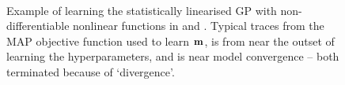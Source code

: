 \documentclass{article} %
\begin{document}
\begin{figure}[htb]
    \\
    \caption[]{Example of learning the statistically linearised GP with
        non-differentiable nonlinear functions in  and
        . Typical traces from the MAP objective function used
        to learn $\mathbf{m}$,  is from near the outset of
        learning the hyperparameters, and  is near model
        convergence -- both terminated because of `divergence'.}
    \label{fig:learnex}
\end{figure}
\end{document}
